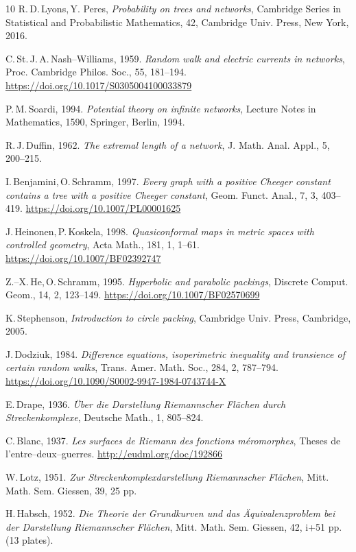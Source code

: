 \documentclass[final,3p,times]{elsarticle}
\theoremstyle{definition}
\begin{document}
\begin{thebibliography}{10}
R.\,D.\,Lyons,\,Y. Peres, 
\emph{Probability on trees and networks}, 
Cambridge Series in Statistical and Probabilistic Mathematics, 42, 
Cambridge Univ. Press, New York, 
2016.

C.\,St.\,J.\,A.\,Nash--Williams, 
1959.
\emph{Random walk and electric currents in networks}, 
Proc. Cambridge Philos. Soc., 
55, 181--194.
\url{https://doi.org/10.1017/S0305004100033879}

P.\,M.\,Soardi, 
1994. 
\emph{Potential theory on infinite networks}, 
Lecture Notes in Mathematics, 1590, Springer, Berlin, 
1994.

R.\,J.\,Duffin, 
1962.
\emph{The extremal length of a network}, J. Math. Anal. Appl.,
5, 200--215.

I.\,Benjamini,\,O.\,Schramm, 
1997.
\emph{Every graph with a positive Cheeger constant contains a tree with a positive Cheeger constant}, 
Geom. Funct. Anal.,
7, 3, 403--419.
\url{https://doi.org/10.1007/PL00001625}

J.\,Heinonen,\,P.\,Koskela, 
1998.
\emph{Quasiconformal maps in metric spaces with controlled geometry}, 
Acta Math.,
181, 1, 1--61.
\url{https://doi.org/10.1007/BF02392747}

Z.--X.\,He,\,O.\,Schramm,
1995. 
\emph{Hyperbolic and parabolic packings}, 
Discrete Comput. Geom., 
14, 2, 123--149. 
\url{https://doi.org/10.1007/BF02570699}

K.\,Stephenson, 
\emph{Introduction to circle packing}, 
Cambridge Univ. Press, Cambridge, 
2005.

J.\,Dodziuk, 
1984.
\emph{Difference equations, isoperimetric inequality and transience of certain random walks}, 
Trans. Amer. Math. Soc.,
284, 2, 787--794.
\url{https://doi.org/10.1090/S0002-9947-1984-0743744-X}

E.\,Drape,
1936. 
\emph{Über die Darstellung Riemannscher Flächen durch Streckenkomplexe},
Deutsche Math., 1, 805--824. 

C.\,Blanc, 
1937.
\emph{Les surfaces de Riemann des fonctions m{\'e}romorphes},
Theses de l’entre--deux--guerres.
\url{http://eudml.org/doc/192866}

W.\,Lotz, 
1951.
\emph{Zur Streckenkomplexdarstellung Riemannscher Fl\"achen}, 
Mitt. Math. Sem. Giessen,
39, 25 pp.

H.\,Habsch, 
1952.
\emph{Die Theorie der Grundkurven und das \"Aquivalenzproblem bei der Darstellung Riemannscher Fl\"achen}, 
Mitt. Math. Sem. Giessen,
42, {\rm i}+51 pp. (13 plates). 


\end{thebibliography}
\end{document}
